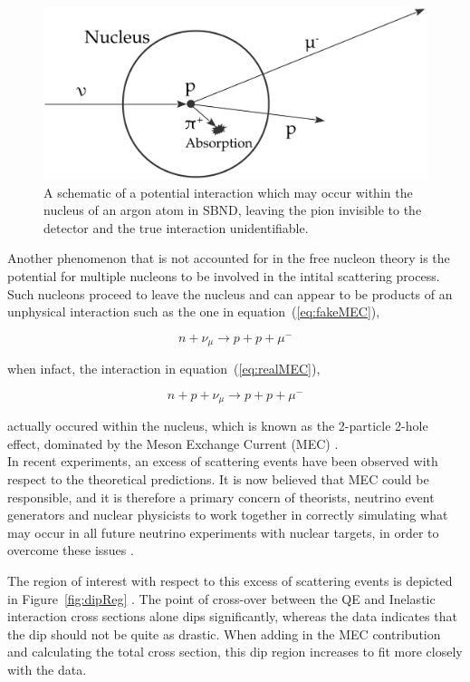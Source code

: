     \begin{figure}[h!]
        \centering
        \includegraphics[width=.6\textwidth]{images/inter_nuc.pdf}
        \caption{A schematic of a potential interaction which may occur within the nucleus of an argon atom in SBND, leaving the pion invisible to the detector and the true interaction unidentifiable.}
        \label{fig:interNuc}
    \end{figure}

Another phenomenon that is not accounted for in the free nucleon theory is the potential for multiple nucleons to be involved in the intital scattering process. Such nucleons proceed to leave the nucleus and can appear to be products of an unphysical interaction such as the one in equation~(\ref{eq:fakeMEC}),

    \begin{equation}\label{eq:fakeMEC}
        n + \nu_{\mu} \longrightarrow p + p + \mu^{-}
    \end{equation}

    when infact, the interaction in equation~(\ref{eq:realMEC}),
    
    \begin{equation}\label{eq:realMEC}
        n + p + \nu_{\mu} \longrightarrow p + p + \mu^{-}
    \end{equation}

    actually occured within the nucleus, which is known as the 2-particle 2-hole effect, dominated by the Meson Exchange Current (MEC) \cite{MEC}.      \\

    In recent experiments, an excess of scattering events have been observed with respect to the theoretical predictions. It is now believed that MEC could be responsible, and it is therefore a primary concern of theorists, neutrino event generators and nuclear physicists to work together in correctly simulating what may occur in all future neutrino experiments with nuclear targets, in order to overcome these issues \cite{MEC}.

    The region of interest with respect to this excess of scattering events is depicted in Figure~\ref{fig:dipReg} \cite{dipReg}. The point of cross-over between the QE and Inelastic interaction cross sections alone dips significantly, whereas the data indicates that the dip should not be quite as drastic. When adding in the MEC contribution and calculating the total cross section, this dip region increases to fit more closely with the data.  

